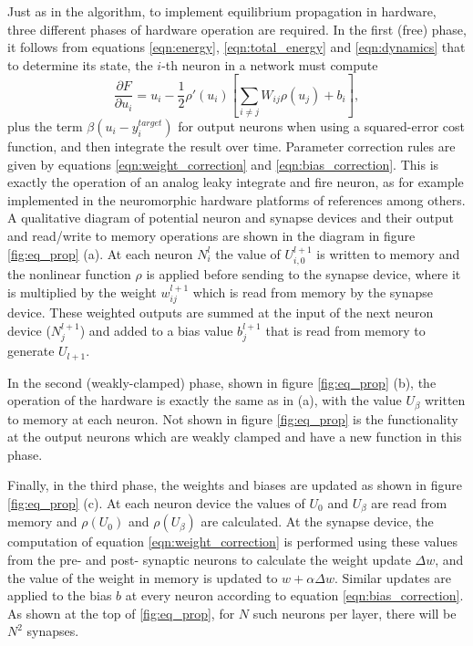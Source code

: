 \documentclass[utf8]{frontiersSCNS}
\begin{document}
Just as in the algorithm, to implement equilibrium propagation in hardware, three
different phases of hardware operation are required. In the first (free) phase, it follows
from equations \ref{eqn:energy}, \ref{eqn:total_energy} and \ref{eqn:dynamics} that to determine 
its state, the $i$-th neuron in a network must compute $$\frac{\partial F}{\partial 
u_i}=u_i-\frac{1}{2}\rho'(u_i)[\sum_{i\neq j}W_{ij}\rho(u_j)+b_i],$$ plus the term 
$\beta(u_i-y_i^{target})$ for output neurons when using a squared-error cost function, and then 
integrate the result over time. Parameter correction rules are given by equations 
\ref{eqn:weight_correction} and \ref{eqn:bias_correction}. This is exactly the 
operation of an analog leaky integrate and fire neuron, as for example implemented in the 
neuromorphic hardware platforms of references \citep{indiveri2011, schemmel2010} among others. A 
qualitative diagram of potential neuron and synapse devices and their output and read/write to 
memory operations are shown in the diagram in figure \ref{fig:eq_prop} (a). At each neuron $N^l_{i}$ 
the value of $U^{l+1}_{i,0}$ is written to memory and the nonlinear function $\rho$ is applied 
before sending to the synapse device, where it is multiplied by the weight $w^{l+1}_{ij}$ which is 
read from memory by the synapse device. These weighted outputs are summed at the input of the next 
neuron device ($N^{l+1}_j$) and added to a bias value $b^{l+1}_j$ that is read from memory to 
generate $U_{l+1}$.

In the second (weakly-clamped) phase, shown in figure \ref{fig:eq_prop} (b), the operation of the 
hardware is exactly the same as in (a), with the value $U_{\beta}$ written to memory at each 
neuron. Not shown in figure \ref{fig:eq_prop} is the functionality at the output neurons which are 
weakly clamped and have a new function in this phase.

Finally, in the third phase, the weights and biases are updated as shown in figure \ref{fig:eq_prop} (c). At each neuron device the values of $U_0$ and $U_\beta$ are read from memory and $\rho({U_0})$ and $\rho({U_\beta})$ are calculated. At the synapse device, the computation of equation \ref{eqn:weight_correction} is performed using these values from the pre- and post- synaptic neurons to calculate the weight update $\Delta w$, and the value of the weight in memory is updated to $w+\alpha\Delta w$.  Similar updates are applied to the bias $b$ at every neuron according to equation \ref{eqn:bias_correction}. As shown at the top of  \ref{fig:eq_prop}, for $N$ such neurons per layer, there will be $N^2$ synapses.
\end{document}
